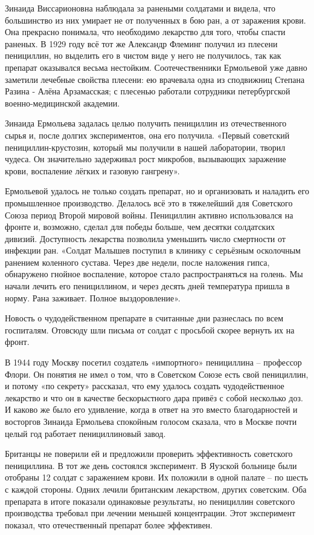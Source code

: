 Зинаида Виссарионовна наблюдала за ранеными солдатами и видела, что большинство
из них умирает не от полученных в бою ран, а от заражения крови. Она прекрасно
понимала, что необходимо лекарство для того, чтобы спасти раненых. В 1929 году
всё тот же Александр Флеминг получил из плесени пенициллин, но выделить его в
чистом виде у него не получилось, так как препарат оказывался весьма нестойким.
Соотечественники Ермольевой уже давно заметили лечебные свойства плесени: ею
врачевала одна из сподвижниц Степана Разина - Алёна Арзамасская; с плесенью
работали сотрудники петербургской военно-медицинской академии.

Зинаида Ермольева задалась целью получить пенициллин из отечественного сырья и,
после долгих экспериментов, она его получила. «Первый советский
пенициллин-крустозин, который мы получили в нашей лаборатории, творил чудеса.
Он значительно задерживал рост микробов, вызывающих заражение крови, воспаление
лёгких и газовую гангрену».

Ермольевой удалось не только создать препарат, но и организовать и наладить его
промышленное производство. Делалось всё это в тяжелейший для Советского Союза
период Второй мировой войны. Пенициллин активно использовался на фронте и,
возможно, сделал для победы больше, чем десятки солдатских дивизий. Доступность
лекарства позволила уменьшить число смертности от инфекции ран. «Солдат Малышев
поступил в клинику с серьёзным осколочным ранением коленного сустава. Через две
недели, после наложения гипса, обнаружено гнойное воспаление, которое стало
распространяться на голень. Мы начали лечить его пенициллином, и через десять
дней температура пришла в норму. Рана заживает. Полное выздоровление».

Новость о чудодейственном препарате в считанные дни разнеслась по всем
госпиталям. Отовсюду шли письма от солдат с просьбой скорее вернуть их на
фронт.

В 1944 году Москву посетил создатель «импортного» пенициллина – профессор
Флори. Он понятия не имел о том, что в Советском Союзе есть свой пенициллин, и
потому «по секрету» рассказал, что ему удалось создать чудодейственное
лекарство и что он в качестве бескорыстного дара привёз с собой несколько доз.
И каково же было его удивление, когда в ответ на это вместо благодарностей и
восторгов Зинаида Ермольева спокойным голосом сказала, что в Москве почти целый
год работает пенициллиновый завод.

Британцы не поверили ей и предложили проверить эффективность советского
пенициллина. В тот же день состоялся эксперимент. В Яузской больнице были
отобраны 12 солдат с заражением крови. Их положили в одной палате – по шесть с
каждой стороны. Одних лечили британским лекарством, других советским. Оба
препарата в итоге показали одинаковые результаты, но пенициллин советского
производства требовал при лечении меньшей концентрации. Этот эксперимент
показал, что отечественный препарат более эффективен.

